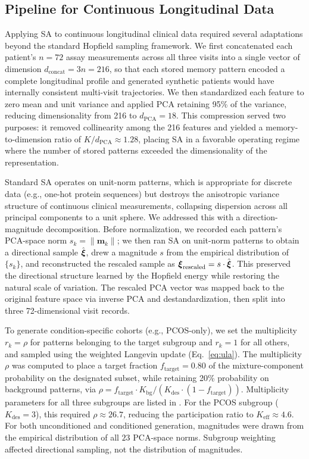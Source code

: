 \subsection{Pipeline for Continuous Longitudinal Data}
\label{sec:pipeline}

Applying SA to continuous longitudinal clinical data required several adaptations
beyond the standard Hopfield sampling framework. We first concatenated each patient's
$n{=}72$ assay measurements across all three visits into a single vector of dimension
$d_{\text{concat}} = 3n = 216$, so that each stored memory pattern encoded a
complete longitudinal profile and generated synthetic patients would have internally
consistent multi-visit trajectories. We then standardized each feature to zero mean
and unit variance and applied PCA retaining 95\% of the variance, reducing
dimensionality from 216 to $d_{\text{PCA}}{=}18$. This compression served two
purposes: it removed collinearity among the 216 features and yielded a
memory-to-dimension ratio of $K/d_{\text{PCA}} \approx 1.28$, placing SA in a
favorable operating regime where the number of stored patterns exceeded the
dimensionality of the representation.

Standard SA operates on unit-norm patterns, which is appropriate for discrete data
(e.g., one-hot protein sequences) but destroys the anisotropic variance structure
of continuous clinical measurements, collapsing dispersion across all principal
components to a unit sphere. We addressed this with a direction-magnitude
decomposition. Before normalization, we recorded each pattern's PCA-space norm
$s_k = \|\mathbf{m}_k\|$; we then ran SA on unit-norm patterns to obtain a
directional sample $\hat{\boldsymbol{\xi}}$, drew a magnitude $s$ from the empirical
distribution of $\{s_k\}$, and reconstructed the rescaled sample as
$\boldsymbol{\xi}_{\text{rescaled}} = s \cdot \hat{\boldsymbol{\xi}}$. This preserved the directional
structure learned by the Hopfield energy while restoring the natural scale of
variation. The rescaled PCA vector was mapped back to the original feature space via
inverse PCA and destandardization, then split into three 72-dimensional visit records.

To generate condition-specific cohorts (e.g., PCOS-only), we set the multiplicity
$r_k = \rho$ for patterns belonging to the target subgroup and $r_k = 1$ for all
others, and sampled using the weighted Langevin update (Eq.~\ref{eq:ula}). The
multiplicity $\rho$ was computed to place a target fraction
$f_{\text{target}} = 0.80$ of the mixture-component probability on the designated subset,
while retaining 20\% probability on background patterns, via
$\rho = f_{\text{target}} \cdot K_{\text{bg}} / (K_{\text{des}} \cdot (1 -
f_{\text{target}}))$. Multiplicity parameters for all three subgroups are
listed in . For the PCOS subgroup
($K_{\text{des}}{=}3$), this required $\rho \approx 26.7$, reducing the
participation ratio to $K_{\text{eff}} \approx 4.6$. For both unconditioned and
conditioned generation, magnitudes were drawn from the empirical distribution of all $23$
PCA-space norms. Subgroup weighting affected directional sampling, not the distribution of
magnitudes.


